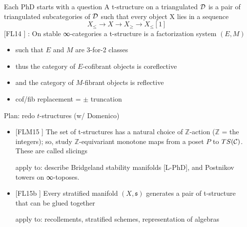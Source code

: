 \documentclass{beamer}
\def\lnk#1{\href{#1}{\faFilePdfO}}
\begin{document}
%
%
%
%
%
\begin{frame}{Each PhD starts with a question}
  A \alert{t-structure} on a triangulated $\cal D$ is a pair of triangulated subcategories of $\cal D$ such that every object X lies in a sequence
\[X_{\le} \to X \to X_\ge \to X_\le[1]\]
[\alert{FL14} \lnk{https://link.springer.com/article/10.1007/s10485-015-9393-z}] : On stable ∞-categories a t-structure is a factorization system $(E,M)$
\begin{itemize}
\item<+-> such that $E$ and $M$ are 3-for-2 classes
\item<+-> thus the category of $E$-cofibrant objects is coreflective
\item<+-> and the category of $M$-fibrant objects is reflective
\item<+-> cof/fib replacement = $\pm$ truncation
\end{itemize}
\end{frame}
%
%
%
\begin{frame}{Plan: redo $t$-structures (w/ Domenico)}
  \begin{itemize}
\item<+-> {} [\alert{FLM15} \lnk{https://link.springer.com/article/10.1007/s40062-019-00237-0}] The set of t-structures has a natural choice of $\mathbb Z$-action ($\mathbb Z$ = the integers); so, study $\mathbb Z$-equivariant monotone maps from a poset $P$ to $TS(\cal C)$. These are called \alert{slicings}

{\footnotesize\color{gray!40} apply to: describe Bridgeland stability manifolds [\alert{L-PhD\lnk{http://tetrapharmakon.github.io/stuff/main.pdf}}], and Postnikov towers on ∞-toposes.}

\item<+-> {} [\alert{FL15b} \lnk{https://arxiv.org/abs/1507.03913}] Every stratified manifold $(X,\mathfrak s)$ generates a pair of t-structure that can be glued together

{\footnotesize\color{gray!40} apply to: recollements, stratified schemes, representation of algebras}

  \end{itemize}
\end{frame}
%
%
%
%
%
\end{document}
